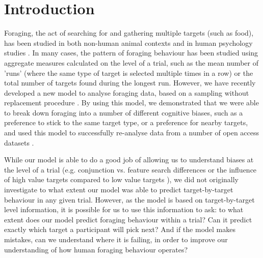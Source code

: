 \documentclass[vision,article,submit,pdftex,moreauthors]{Definitions/mdpi}
\begin{document}



\section{Introduction}

Foraging, the act of searching for and gathering multiple targets (such as food), has been studied in both non-human animal contexts \cite{dawkins1971} and in human psychology studies \cite{kristjansson2014}. In many cases, the pattern of foraging behaviour has been studied using aggregate measures calculated on the level of a trial, such as the mean number of 'runs' (where the same type of target is selected multiple times in a row) or the total number of targets found during the longest run. However, we have recently developed a new model to analyse foraging data, based on a sampling without replacement procedure \cite{clarke2022foraging}. By using this model, we demonstrated that we were able to break down foraging into a number of different cognitive biases, such as a preference to stick to the same target type, or a preference for nearby targets, and used this model to successfully re-analyse data from a number of open access datasets \cite{kristjansson2014, thornton2020, clarke2018, tagu2020}. 

While our model is able to do a good job of allowing us to understand biases at the level of a trial (e.g. conjunction vs. feature search differences \cite{kristjansson2014} or the influence of high value targets compared to low value targets \cite{tagu2020}), we did not originally investigate to what extent our model was able to predict target-by-target behaviour in any given trial. However, as the model is based on target-by-target level information, it is possible for us to use this information to ask: to what extent does our model predict foraging behaviour within a trial? Can it predict exactly which target a participant will pick next? And if the model makes mistakes, can we understand where it is failing, in order to improve our understanding of how human foraging behaviour operates?
\end{document}
